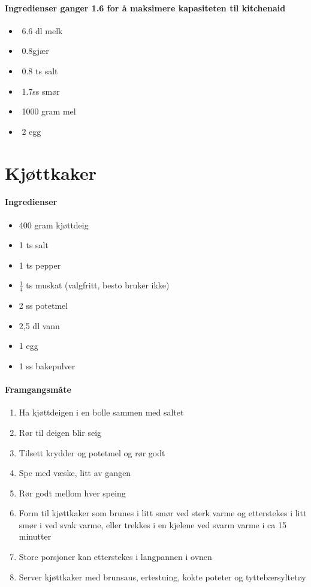 \documentclass[12pt,a4paper]{book}
\begin{document}
\paragraph{Ingredienser ganger 1.6 for å maksimere kapasiteten til kitchenaid}
\begin{itemize}[noitemsep]
	\item﻿ 6.6 dl melk
	\item﻿ 0.8gjær
	\item﻿ 0.8 ts salt
	\item﻿ 1.7ss smør
	\item﻿ 1000 gram mel
	\item﻿ 2 egg
\end{itemize}

\clearpage{}
\clearpage{}\clearpage{}
\clearpage{}\section{﻿Kjøttkaker}


\paragraph{Ingredienser}
\begin{itemize}[noitemsep]
	\item 400 gram kjøttdeig
	\item 1 ts salt
	\item 1 ts pepper
	\item $\frac{1}{4}$  ts muskat (valgfritt, besto bruker ikke)
	\item 2 ss potetmel
	\item 2,5 dl vann
	\item 1 egg
	\item 1 ss bakepulver
\end{itemize}

\paragraph{Framgangsmåte}
\begin{enumerate}[noitemsep]
	\item Ha kjøttdeigen i en bolle sammen med saltet
	\item Rør til deigen blir seig
	\item Tilsett krydder og potetmel og rør godt
	\item Spe med væske, litt av gangen
	\item Rør godt mellom hver speing
	\item Form til kjøttkaker som brunes i litt smør ved sterk varme og etterstekes i litt smør i ved svak varme, eller trekkes i en kjelene ved svarm varme i ca 15 minutter
	\item Store porsjoner kan etterstekes i langpannen i ovnen
	\item Server kjøttkaker med brunsaus, ertestuing, kokte poteter og tyttebærsyltetøy
\end{enumerate}
\end{document}
